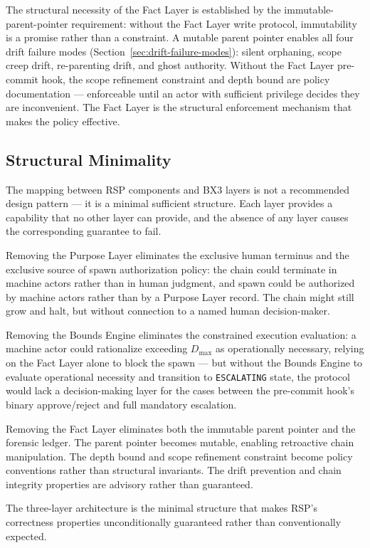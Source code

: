 \medskip
The structural necessity of the Fact Layer is established by the immutable-parent-pointer requirement: without the Fact Layer write protocol, immutability is a promise rather than a constraint. A mutable parent pointer enables all four drift failure modes (Section~\ref{sec:drift-failure-modes}): silent orphaning, scope creep drift, re-parenting drift, and ghost authority. Without the Fact Layer pre-commit hook, the scope refinement constraint and depth bound are policy documentation — enforceable until an actor with sufficient privilege decides they are inconvenient. The Fact Layer is the structural enforcement mechanism that makes the policy effective.

\subsection{Structural Minimality}
\label{sec:rs-minimality}

The mapping between RSP components and BX3 layers is not a recommended design pattern — it is a minimal sufficient structure. Each layer provides a capability that no other layer can provide, and the absence of any layer causes the corresponding guarantee to fail.

Removing the Purpose Layer eliminates the exclusive human terminus and the exclusive source of spawn authorization policy: the chain could terminate in machine actors rather than in human judgment, and spawn could be authorized by machine actors rather than by a Purpose Layer record. The chain might still grow and halt, but without connection to a named human decision-maker.

Removing the Bounds Engine eliminates the constrained execution evaluation: a machine actor could rationalize exceeding $D_{\text{max}}$ as operationally necessary, relying on the Fact Layer alone to block the spawn — but without the Bounds Engine to evaluate operational necessity and transition to \texttt{ESCALATING} state, the protocol would lack a decision-making layer for the cases between the pre-commit hook's binary approve/reject and full mandatory escalation.

Removing the Fact Layer eliminates both the immutable parent pointer and the forensic ledger. The parent pointer becomes mutable, enabling retroactive chain manipulation. The depth bound and scope refinement constraint become policy conventions rather than structural invariants. The drift prevention and chain integrity properties are advisory rather than guaranteed.

The three-layer architecture is the minimal structure that makes RSP's correctness properties unconditionally guaranteed rather than conventionally expected.
